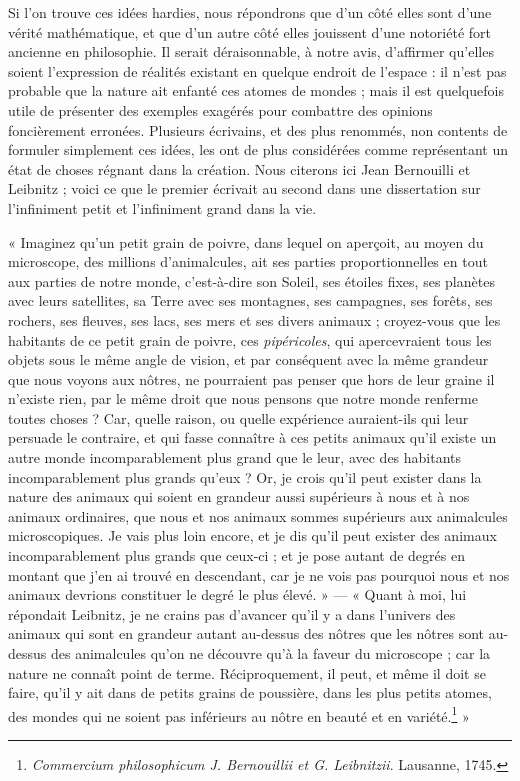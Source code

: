 \documentclass[a4paper, 11pt, oneside, landscape]{article}
\begin{document}
Si l'on trouve ces idées hardies, nous répondrons que d'un côté elles sont d'une vérité mathématique, et que d'un autre côté elles jouissent d'une notoriété fort ancienne en philosophie. Il serait déraisonnable, à notre avis, d'affirmer qu'elles soient l'expression de réalités existant en quelque endroit de l'espace : il n'est pas probable que la nature ait enfanté ces atomes de mondes ; mais il est quelquefois utile de présenter des exemples exagérés pour combattre des opinions foncièrement erronées. Plusieurs écrivains, et des plus renommés, non contents de formuler simplement ces idées, les ont de plus considérées comme représentant un état de choses régnant dans la création. Nous citerons ici Jean Bernouilli et Leibnitz ; voici ce que le premier écrivait au second dans une dissertation sur l'infiniment petit et l'infiniment grand dans la vie.

« Imaginez qu'un petit grain de poivre, dans lequel on aperçoit, au moyen du microscope, des millions d'animalcules, ait ses parties proportionnelles en tout aux parties de notre monde, c'est-à-dire son Soleil, ses étoiles fixes, ses planètes avec leurs satellites, sa Terre avec ses montagnes, ses campagnes, ses forêts, ses rochers, ses fleuves, ses lacs, ses mers et ses divers animaux ; croyez-vous que les habitants de ce petit grain de poivre, ces \emph{pipéricoles}, qui apercevraient tous les objets sous le même angle de vision, et par conséquent avec la même grandeur que nous voyons aux nôtres, ne pourraient pas penser que hors de leur graine il n'existe rien, par le même droit que nous pensons que notre monde renferme toutes choses ? Car, quelle raison, ou quelle expérience auraient-ils qui leur persuade le contraire, et qui fasse connaître à ces petits animaux qu'il existe un autre monde incomparablement plus grand que le leur, avec des habitants incomparablement plus grands qu'eux ? Or, je crois qu'il peut exister dans la nature des animaux qui soient en grandeur aussi supérieurs à nous et à nos animaux ordinaires, que nous et nos animaux sommes supérieurs aux animalcules microscopiques. Je vais plus loin encore, et je dis qu'il peut exister des animaux incomparablement plus grands que ceux-ci ; et je pose autant de degrés en montant que j'en ai trouvé en descendant, car je ne vois pas pourquoi nous et nos animaux devrions constituer le degré le plus élevé. » --- « Quant à moi, lui répondait Leibnitz, je ne crains pas d'avancer qu'il y a dans l'univers des animaux qui sont en grandeur autant au-dessus des nôtres que les nôtres sont au-dessus des animalcules qu'on ne découvre qu'à la faveur du microscope ; car la nature ne connaît point de terme. Réciproquement, il peut, et même il doit se faire, qu'il y ait dans de petits grains de poussière, dans les plus petits atomes, des mondes qui ne soient pas inférieurs au nôtre en beauté et en variété.\footnote{\emph{Commercium philosophicum J. Bernouillii et G. Leibnitzii}. Lausanne, 1745.} »
\end{document}
